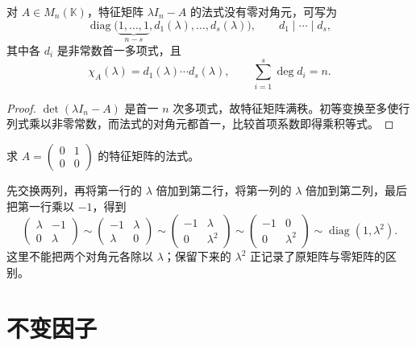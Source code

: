 \begin{corollary}
\label{cor:xie-characteristic-smith}
对 $A\in M_n(\mathbb K)$，特征矩阵 $\lambda I_n-A$ 的法式没有零对角元，可写为
\begin{equation}
\label{eq:xie-characteristic-smith}
    \operatorname{diag}\bigl(\underbrace{1,\ldots,1}_{n-s},d_1(\lambda),\ldots,d_s(\lambda)\bigr),
    \qquad d_1\mid\cdots\mid d_s,
\end{equation}
其中各 $d_i$ 是非常数首一多项式，且
\[
    \chi_A(\lambda)=d_1(\lambda)\cdots d_s(\lambda),
    \qquad \sum_{i=1}^s\deg d_i=n.
\]
\end{corollary}
\begin{proof}
$\det(\lambda I_n-A)$ 是首一 $n$ 次多项式，故特征矩阵满秩。初等变换至多使行列式乘以非零常数，而法式的对角元都首一，比较首项系数即得乘积等式。
\end{proof}

\begin{example}
\label{ex:xie-nilpotent-smith}
求 $A=\begin{pmatrix}0&1\\0&0\end{pmatrix}$ 的特征矩阵的法式。
\end{example}
\begin{solve}
先交换两列，再将第一行的 $\lambda$ 倍加到第二行，将第一列的 $\lambda$ 倍加到第二列，最后把第一行乘以 $-1$，得到
\[
    \begin{pmatrix}\lambda&-1\\0&\lambda\end{pmatrix}
    \sim\begin{pmatrix}-1&\lambda\\\lambda&0\end{pmatrix}
    \sim\begin{pmatrix}-1&\lambda\\0&\lambda^2\end{pmatrix}
    \sim\begin{pmatrix}-1&0\\0&\lambda^2\end{pmatrix}
    \sim\operatorname{diag}(1,\lambda^2).
\]
这里不能把两个对角元各除以 $\lambda$；保留下来的 $\lambda^2$ 正记录了原矩阵与零矩阵的区别。
\end{solve}

\section{不变因子}
\label{sec:xie-invariant-factors}

